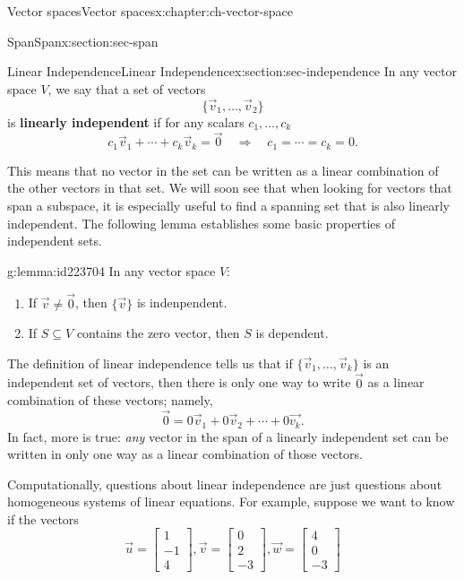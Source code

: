 \documentclass[oneside,10pt,]{book}
\newcommand{\terminology}[1]{\textbf{#1}}
\numberwithin{equation}{section}
\newcommand{\bbm}{\begin{bmatrix}}
\newcommand{\ebm}{\end{bmatrix}}
\begin{document}
\begin{chapterptx}{Vector spaces}{}{Vector spaces}{}{}{x:chapter:ch-vector-space}
\begin{sectionptx}{Span}{}{Span}{}{}{x:section:sec-span}
\end{sectionptx}
%
%
\typeout{************************************************}
\typeout{************************************************}
%
\begin{sectionptx}{Linear Independence}{}{Linear Independence}{}{}{x:section:sec-independence}
In any vector space \(V\), we say that a set of vectors%
\begin{equation*}
\{\vec{v}_1,\ldots,\vec{v}_2\}
\end{equation*}
is \terminology{linearly independent} if for any scalars \(c_1,\ldots, c_k\)%
\begin{equation*}
c_1\vec{v}_1+\cdots + c_k\vec{v}_k = \vec{0} \quad\Rightarrow\quad c_1=\cdots = c_k=0\text{.}
\end{equation*}
%
\par
This means that no vector in the set can be written as a linear combination of the other vectors in that set. We will soon see that when looking for vectors that span a subspace, it is especially useful to find a spanning set that is also linearly independent. The following lemma establishes some basic properties of independent sets.%
\begin{lemma}{}{}{g:lemma:id223704}%
In any vector space \(V\):%
\begin{enumerate}
\item{}If \(\vec{v}\neq\vec{0}\), then \(\{\vec{v}\}\) is indenpendent.%
\item{}If \(S\subseteq V\) contains the zero vector, then \(S\) is dependent.%
\end{enumerate}
%
\end{lemma}
The definition of linear independence tells us that if \(\{\vec{v}_1,\ldots, \vec{v}_k\}\) is an independent set of vectors, then there is only one way to write \(\vec{0}\) as a linear combination of these vectors; namely,%
\begin{equation*}
\vec{0} = 0\vec{v}_1+0\vec{v}_2+\cdots +0\vec{v_k}\text{.}
\end{equation*}
In fact, more is true: \emph{any} vector in the span of a linearly independent set can be written in only one way as a linear combination of those vectors.%
\par
Computationally, questions about linear independence are just questions about homogeneous systems of linear equations. For example, suppose we want to know if the vectors%
\begin{equation*}
\vec{u}=\bbm 1\\-1\\4\ebm, \vec{v}=\bbm 0\\2\\-3\ebm, \vec{w}=\bbm 4\\0\\-3\ebm

\end{equation*}
\end{sectionptx}
\end{chapterptx}
\end{document}
